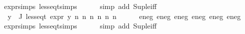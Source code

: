 \begin{isabellebody}
expr{\isachardot}{\kern0pt}simps\ less{\isacharunderscore}{\kern0pt}eq{\isacharunderscore}{\kern0pt}t{\isachardot}{\kern0pt}simps\isanewline
\ \ \ \ \isamarkupfalse%
\ {\isacharparenleft}{\kern0pt}simp\ add{\isacharcolon}{\kern0pt}\ Sup{\isacharunderscore}{\kern0pt}le{\isacharunderscore}{\kern0pt}iff{\isacharparenright}{\kern0pt}\isanewline
\isanewline
\ \ \isamarkupfalse%
\ {\isachardoublequoteopen}{\isasymforall}y{\isasymin}{\isasymPhi}\ {\isacharbackquote}{\kern0pt}\ J{\isachardot}{\kern0pt}\ less{\isacharunderscore}{\kern0pt}eq{\isacharunderscore}{\kern0pt}t\ {\isacharparenleft}{\kern0pt}expr\ y{\isacharparenright}{\kern0pt}\ {\isacharparenleft}{\kern0pt}n{}{\isacharcomma}{\kern0pt}\ n{}{\isacharcomma}{\kern0pt}\ n{}{\isacharcomma}{\kern0pt}\ n{}{\isacharcomma}{\kern0pt}\ n{}{\isacharcomma}{\kern0pt}\ n{}{\isacharparenright}{\kern0pt}{\isachardoublequoteclose}\isanewline
\ \ \ \ \isamarkupfalse%
\ e{}{\isacharunderscore}{\kern0pt}neg\ e{}{\isacharunderscore}{\kern0pt}neg\ e{}{\isacharunderscore}{\kern0pt}neg\ e{}{\isacharunderscore}{\kern0pt}neg\ e{}{\isacharunderscore}{\kern0pt}neg\ e{}{\isacharunderscore}{\kern0pt}neg\isanewline
expr{\isachardot}{\kern0pt}simps\ less{\isacharunderscore}{\kern0pt}eq{\isacharunderscore}{\kern0pt}t{\isachardot}{\kern0pt}simps\isanewline
\ \ \ \ \isamarkupfalse%
\ {\isacharparenleft}{\kern0pt}simp\ add{\isacharcolon}{\kern0pt}\ Sup{\isacharunderscore}{\kern0pt}le{\isacharunderscore}{\kern0pt}iff{\isacharparenright}{\kern0pt}\isanewline
{}\isamarkupfalse%
\isanewline
%
\endisatagproof
{\isafoldproof}%
%
\isadelimproof
%
\endisadelimproof
%
\isadelimtheory
%
\endisadelimtheory
%
\isatagtheory
%
\endisatagtheory
{\isafoldtheory}%
%
\isadelimtheory
%
\endisadelimtheory
%
\end{isabellebody}%
\endinput
